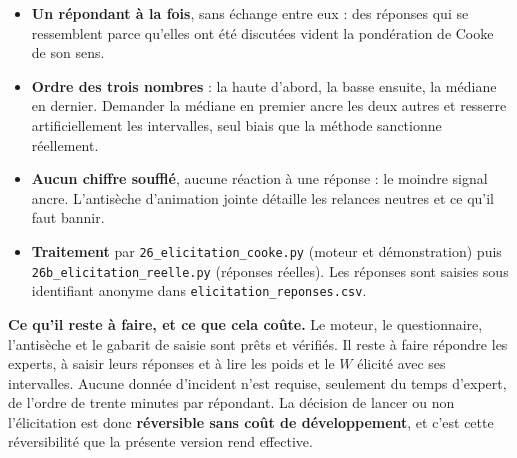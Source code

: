 \documentclass[11pt,a4paper]{article}
\begin{document}
\begin{itemize}\itemsep2pt
\item \textbf{Un répondant à la fois}, sans échange entre eux : des réponses qui se ressemblent
      parce qu'elles ont été discutées vident la pondération de Cooke de son sens.
\item \textbf{Ordre des trois nombres} : la haute d'abord, la basse ensuite, la médiane en
      dernier. Demander la médiane en premier ancre les deux autres et resserre artificiellement
      les intervalles, seul biais que la méthode sanctionne réellement.
\item \textbf{Aucun chiffre soufflé}, aucune réaction à une réponse : le moindre signal ancre.
      L'antisèche d'animation jointe détaille les relances neutres et ce qu'il faut bannir.
\item \textbf{Traitement} par \texttt{26\_elicitation\_cooke.py} (moteur et démonstration) puis
      \texttt{26b\_elicitation\_reelle.py} (réponses réelles). Les réponses sont saisies sous
      identifiant anonyme dans \texttt{elicitation\_reponses.csv}.
\end{itemize}

\begin{cle}
\textbf{Ce qu'il reste à faire, et ce que cela coûte.} Le moteur, le questionnaire, l'antisèche et
le gabarit de saisie sont prêts et vérifiés. Il reste à faire répondre les experts, à saisir leurs
réponses et à lire les poids et le $W$ élicité avec ses intervalles. Aucune donnée d'incident
n'est requise, seulement du temps d'expert, de l'ordre de trente minutes par répondant. La
décision de lancer ou non l'élicitation est donc \textbf{réversible sans coût de développement},
et c'est cette réversibilité que la présente version rend effective.
\end{cle}
\end{document}
